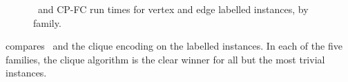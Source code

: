\begin{figure}[htb]
{        \label{figure:mcs33ved-runtime-mcsplitdown-cpfc-bv}
    }
    \caption{\McSplitDown\ and CP-FC run times for vertex and edge labelled instances, by family.}
    \label{figure:mcs33ved-runtime-mcsplitdown-cpfc-scatters}
\end{figure}


\FloatBarrier

 compares \McSplitDown\ and the clique
encoding on the labelled instances.
In each of the five families, the clique algorithm
is the clear winner for all but the most trivial instances.

